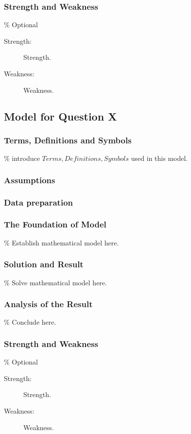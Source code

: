 \documentclass{apmcmthesis}
\begin{document}
\subsubsection{Strength and Weakness}
\% Optional
\begin{description}
\item[Strength:] Strength.
\item[Weakness:] Weakness.
\end{description}


\subsection{Model for Question X}

\subsubsection{Terms, Definitions and Symbols}
\% introduce $Terms, Definitions, Symbols$ used in this model.

\subsubsection{Assumptions}


\subsubsection{Data preparation}


\subsubsection{The Foundation of Model}
\% Establish mathematical model here.


\subsubsection{Solution and Result}
\% Solve mathematical model here.


\subsubsection{Analysis of the Result}
\% Conclude here.


\subsubsection{Strength and Weakness}
\% Optional
\begin{description}
	\item[Strength:] Strength.
	\item[Weakness:] Weakness.
\end{description}
\end{document}

